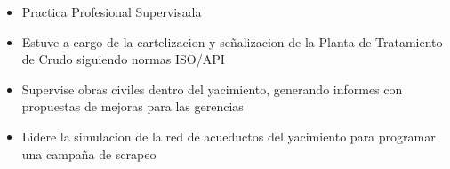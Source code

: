 \documentclass[10pt,a4paper,ragged2e,withhyper]{altacv}
\begin{document}
\begin{paracol}{2}


\begin{itemize}
\item Practica Profesional Supervisada
\item Estuve a cargo de la cartelizacion y señalizacion de la Planta de Tratamiento de Crudo siguiendo normas ISO/API
\item Supervise obras civiles dentro del yacimiento, generando informes con propuestas de mejoras para las gerencias
\item Lidere la simulacion de la red de acueductos del yacimiento para programar una campaña de scrapeo 
\end{itemize}











\end{paracol}
\end{document}
